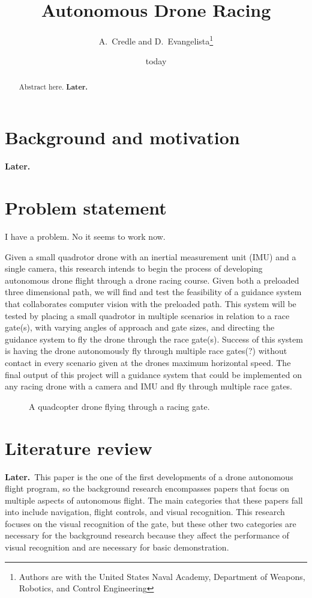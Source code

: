 \documentclass[onecolumn,10pt]{IEEEtran}
\title{Autonomous Drone Racing}
\author{A.~Credle and D.~Evangelista\thanks{Authors are with the United States Naval Academy, Department of Weapons, Robotics, and Control Engineering}}
\date{today}
\newcommand{\myroot}{../}
\newcommand{\Later}{\textbf{Later.}}
\begin{document}
\maketitle

\begin{abstract}
Abstract here. \Later
\end{abstract}

\section{Background and motivation}
\Later

\section{Problem statement}
I have a problem. No it seems to work now. 

Given a small quadrotor drone with an inertial measurement unit (IMU) and a single camera, this research intends to begin the process of developing autonomous drone flight through a drone racing course. Given both a preloaded three dimensional path,  we will find and test the feasibility of a guidance system that collaborates computer vision with the preloaded path. This system will be tested by placing a small quadrotor in multiple scenarios in relation to a race gate(s), with varying angles of approach and gate sizes, and directing the guidance system to fly the drone through the race gate(s). Success of this system is having the drone autonomously fly through multiple race gates(?) without contact in every scenario given at the drones maximum horizontal speed. The final output of this project will a guidance system that could be implemented on any racing drone with a camera and IMU and fly through multiple race gates. 
\begin{figure}[h]
\begin{center}
\end{center}
\caption{A quadcopter drone flying through a racing gate.}
\label{fig-problem-statement-1}
\end{figure}

\section{Literature review}
\Later\ This paper is the one of the first developments of a drone autonomous flight program, so the background research encompasses papers that focus on multiple aspects of autonomous flight. The main categories that these papers fall into include navigation, flight controls, and visual recognition. This research focuses on the visual recognition of the gate, but these other two categories are necessary for the background research because they affect the performance of visual recognition and are necessary for basic demonstration. 
\end{document}
